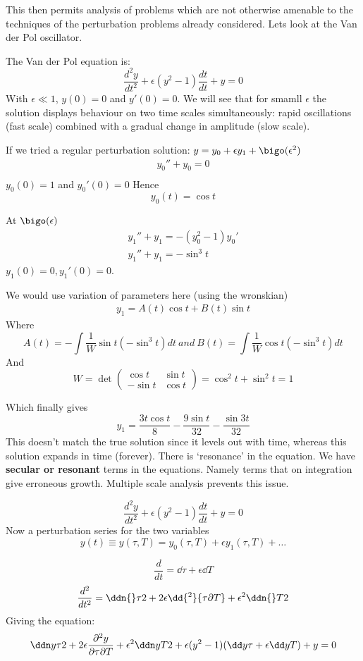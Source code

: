 \documentclass{X:/Documents/Coding/Latex/myassignment}
\begin{document}
This then permits analysis of problems which are not otherwise amenable to the techniques of the perturbation problems already considered. Lets look at the Van der Pol oscillator.


The Van der Pol equation is:
\[\frac{d^2y}{dt^2} + \epsilon(y^2-1) \frac{dt}{dt} + y = 0\]
With $\epsilon \ll1$, $y(0)=0$ and $y'(0)=0$. We will see that for smamll $\epsilon$ the solution displays behaviour on two time scales simultaneously: rapid oscillations (fast scale) combined with a gradual change in amplitude (slow scale).

If we tried a regular perturbation solution:
$y=y_0 + \epsilon y_1 + \bigo(\epsilon^2)$
\begin{align*}
    y_0'' + y_0 = 0\\
\end{align*}
$y_0(0)=1$ and $y_0'(0)=0$
Hence
\[y_0(t) = \cos t\]

At $\bigo(\epsilon)$
\begin{align*}
    y_1'' + y_1 = -(y_0^2 - 1) y_0'\\
    y_1'' + y_1 = -\sin^3 t
\end{align*}
$y_1(0)=0, y_1'(0)=0$.

We would use variation of parameters here (using the wronskian)
\begin{align*}
    y_1 = A(t)\cos t + B(t)\sin t
\end{align*}
Where
\[A(t) = -\int \frac1W \sin t(-\sin^3 t) dt \ and \ B(t) = \int \frac1W \cos t(-\sin^3 t) dt \]
And 
\[W = \det\begin{pmatrix}
    \cos t & \sin t\\-\sin t&\cos t
\end{pmatrix} = \cos^2 t + \sin^2 t = 1 \]

Which finally gives
\[y_1 = \frac{3t\cos t}{8} - \frac{9\sin t}{32} - \frac{\sin 3t}{32}\]
This doesn't match the true solution since it levels out with time, whereas this solution expands in time (forever). There is `resonance' in the equation. We have \textbf{secular or resonant} terms in the equations. Namely terms that on integration give erroneous growth. Multiple scale analysis prevents this issue.

 \[\frac{d^2y}{dt^2} + \epsilon(y^2-1) \frac{dt}{dt} + y = 0\]
Now a perturbation series for the two variables
\[y(t) \equiv y(\tau,T) = y_0(\tau,T) + \epsilon y_1(\tau,T) + \ldots\]

\[\frac{d}{dt} = \dd{}\tau + \epsilon \dd{}T\]
\[\frac{d^2}{dt^2} = \ddn{}\tau2 + 2\epsilon \dd{^2}{\tau\partial T} + \epsilon^2 \ddn{}T2\]
Giving the equation:
\[\ddn y\tau 2 + 2\epsilon \frac{\partial^2y}{\partial \tau \partial T} + \epsilon^2 \ddn yT2 + \epsilon(y^2 -1)(\dd y \tau + \epsilon \dd y T) + y = 0\]
\end{document}
